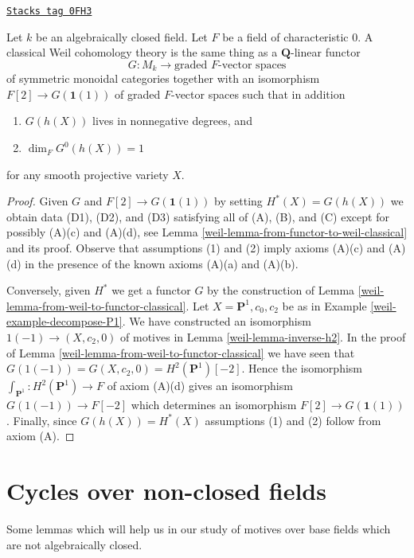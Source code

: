 \begin{proposition}
\label{weil-proposition-weil-cohomology-theory-classical}
\href{https://stacks.math.columbia.edu/tag/0FH3}{\texttt{Stacks tag 0FH3}}

Let $k$ be an algebraically closed field. Let $F$ be a field of
characteristic $0$. A classical Weil cohomology theory is the same thing
as a $\mathbf{Q}$-linear functor
$$
G : M_k \longrightarrow \text{graded }F\text{-vector spaces}
$$
of symmetric monoidal categories together with an isomorphism
$F[2] \to G(\mathbf{1}(1))$ of graded $F$-vector spaces such that
in addition
\begin{enumerate}
\item $G(h(X))$ lives in nonnegative degrees, and
\item $\dim_F G^0(h(X)) = 1$
\end{enumerate}
for any smooth projective variety $X$.
\end{proposition}

\begin{proof}

Given $G$ and $F[2] \to G(\mathbf{1}(1))$ by setting $H^*(X) = G(h(X))$
we obtain data (D1), (D2), and (D3) satisfying all of (A), (B), and (C)
except for possibly (A)(c) and (A)(d), see
Lemma \ref{weil-lemma-from-functor-to-weil-classical} and its proof.
Observe that assumptions (1) and (2) imply axioms (A)(c) and (A)(d)
in the presence of the known axioms (A)(a) and (A)(b).

\medskip\noindent
Conversely, given $H^*$ we get a functor $G$ by the construction of
Lemma \ref{weil-lemma-from-weil-to-functor-classical}.
Let $X = \mathbf{P}^1, c_0, c_2$ be as in Example \ref{weil-example-decompose-P1}.
We have constructed an isomorphism $1(-1) \to (X, c_2, 0)$ of motives in
Lemma \ref{weil-lemma-inverse-h2}. In the proof of
Lemma \ref{weil-lemma-from-weil-to-functor-classical} we have seen that
$G(1(-1)) = G(X, c_2, 0) = H^2(\mathbf{P}^1)[-2]$.
Hence the isomorphism $\int_{\mathbf{P}^1} : H^2(\mathbf{P}^1) \to F$
of axiom (A)(d) gives an isomorphism $G(1(-1)) \to F[-2]$ which
determines an isomorphism $F[2] \to G(\mathbf{1}(1))$.
Finally, since $G(h(X)) = H^*(X)$ assumptions (1) and (2)
follow from axiom (A).
\end{proof}

\section{Cycles over non-closed fields}
\label{weil-section-cycles-nonclosed}
Some lemmas which will help us in our study of motives
over base fields which are not algebraically closed.

